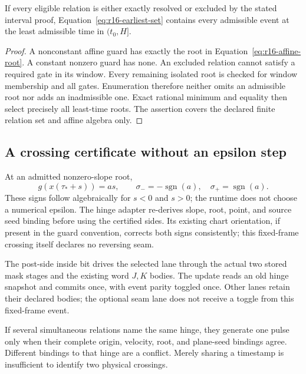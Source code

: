 \begin{proposition}
If every eligible relation is either exactly resolved or excluded by
the stated interval proof, Equation~\eqref{eq:r16-earliest-set} contains
every admissible event at the least admissible time in $(t_0,H]$.
\end{proposition}
\begin{proof}
A nonconstant affine guard has exactly the root in
Equation~\eqref{eq:r16-affine-root}. A constant nonzero guard has none.
An excluded relation cannot satisfy a required gate in its window.
Every remaining isolated root is checked for window membership and
all gates. Enumeration therefore neither omits an admissible root nor
adds an inadmissible one. Exact rational minimum and equality then
select precisely all least-time roots. The assertion covers the
declared finite relation set and affine algebra only.
\end{proof}

\subsection{A crossing certificate without an epsilon step}

At an admitted nonzero-slope root,
\begin{equation}
 g(x(\tau_*+s))=a s,\qquad
 \sigma_-=-\operatorname{sgn}(a),\quad
 \sigma_+=\operatorname{sgn}(a).
 \label{eq:r16-crossing-sides}
\end{equation}
These signs follow algebraically for $s<0$ and $s>0$; the runtime does
not choose a numerical epsilon. The hinge adapter re-derives slope,
root, point, and source seed binding before using the certified sides.
Its existing chart orientation, if present in the guard convention,
corrects both signs consistently; this fixed-frame crossing itself
declares no reversing seam.

The post-side inside bit drives the selected lane through the actual
two stored mask stages and the existing word $J,K$ bodies. The update
reads an old hinge snapshot and commits once, with event parity toggled
once. Other lanes retain their declared bodies; the optional seam lane
does not receive a toggle from this fixed-frame event.

If several simultaneous relations name the same hinge, they generate
one pulse only when their complete origin, velocity, root, and plane-seed
bindings agree. Different bindings to that hinge are a conflict. Merely
sharing a timestamp is insufficient to identify two physical crossings.

